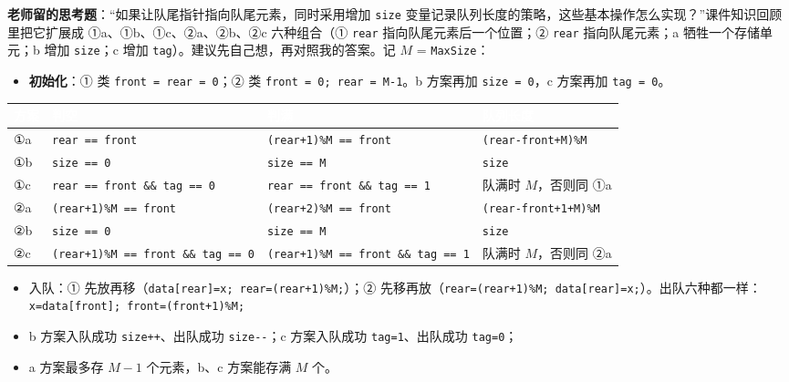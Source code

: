 \documentclass[10.5pt,a4paper,oneside]{article}
\providecommand{\tightlist}{\setlength{\itemsep}{2pt}\setlength{\parskip}{0pt}}
\begin{document}
\begin{addbox}

\textbf{老师留的思考题}：“如果让队尾指针指向队尾元素，同时采用增加
\texttt{size}
变量记录队列长度的策略，这些基本操作怎么实现？”课件知识回顾里把它扩展成
①a、①b、①c、②a、②b、②c 六种组合（① \texttt{rear}
指向队尾元素后一个位置；② \texttt{rear} 指向队尾元素；a
牺牲一个存储单元；b 增加 \texttt{size}；c 增加
\texttt{tag}）。建议先自己想，再对照我的答案。记 \(M\) =
\texttt{MaxSize}：

\begin{itemize}
\tightlist
\item
  \textbf{初始化}：① 类 \texttt{front\ =\ rear\ =\ 0}；② 类
  \texttt{front\ =\ 0;\ rear\ =\ M-1}。b 方案再加 \texttt{size\ =\ 0}，c
  方案再加 \texttt{tag\ =\ 0}。
\end{itemize}

{
\begin{xltabular}{\linewidth}{>{\hsize\raggedright\arraybackslash}X>{\hsize\raggedright\arraybackslash}X>{\hsize\raggedright\arraybackslash}X>{\hsize\raggedright\arraybackslash}X}
\textcolor{white}{\bfseries 方案} & \textcolor{white}{\bfseries 判空} & \textcolor{white}{\bfseries 判满} & \textcolor{white}{\bfseries 队列长度} \\
\endfirsthead
①a & \texttt{rear\ ==\ front} & \texttt{(rear+1)\%M\ ==\ front} & \texttt{(rear-front+M)\%M} \\ \hline
①b & \texttt{size\ ==\ 0} & \texttt{size\ ==\ M} & \texttt{size} \\ \hline
①c & \texttt{rear\ ==\ front\ \&\&\ tag\ ==\ 0} & \texttt{rear\ ==\ front\ \&\&\ tag\ ==\ 1} & 队满时 \(M\)，否则同 ①a \\ \hline
②a & \texttt{(rear+1)\%M\ ==\ front} & \texttt{(rear+2)\%M\ ==\ front} & \texttt{(rear-front+1+M)\%M} \\ \hline
②b & \texttt{size\ ==\ 0} & \texttt{size\ ==\ M} & \texttt{size} \\ \hline
②c & \texttt{(rear+1)\%M\ ==\ front\ \&\&\ tag\ ==\ 0} & \texttt{(rear+1)\%M\ ==\ front\ \&\&\ tag\ ==\ 1} & 队满时 \(M\)，否则同 ②a \\ \hline
\end{xltabular}\par\vspace{4pt}}

\begin{itemize}
\tightlist
\item
  入队：① 先放再移（\texttt{data{[}rear{]}=x;\ rear=(rear+1)\%M;}）；②
  先移再放（\texttt{rear=(rear+1)\%M;\ data{[}rear{]}=x;}）。出队六种都一样：\texttt{x=data{[}front{]};\ front=(front+1)\%M;}
\item
  b 方案入队成功 \texttt{size++}、出队成功 \texttt{size-\/-}；c
  方案入队成功 \texttt{tag=1}、出队成功 \texttt{tag=0}；
\item
  a 方案最多存 \(M-1\) 个元素，b、c 方案能存满 \(M\) 个。
\end{itemize}


\end{addbox}
\end{document}
